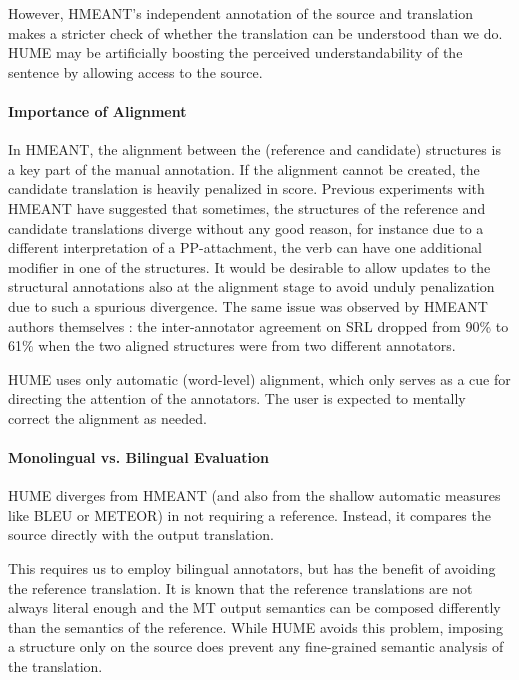 \documentclass[11pt]{article}
\def\parcite#1{\cite{#1}}
\begin{document}
However, HMEANT's independent annotation of the source and translation makes a stricter check
of whether the translation can be understood
than we do. HUME may be artificially boosting the perceived understandability of
the sentence by allowing access to the source.

\paragraph{Importance of Alignment}

In HMEANT, the alignment between the (reference and candidate) structures is a key
part of the manual annotation. If the alignment cannot be created, the candidate
translation is heavily penalized in score.
Previous experiments with HMEANT
\parcite{bojar:wu:ssst:2012,chuchunkov-tarelkin-galinskaya:2014:SSST-8} have
suggested that sometimes, the structures of the reference and candidate
translations diverge without any good reason, for instance due to a different
interpretation of a PP-attachment, the verb can have one additional modifier in
one of the structures. It would be desirable to allow updates to the structural
annotations also at the alignment stage
to avoid unduly penalization due to such a spurious divergence.
The same issue was observed by HMEANT authors themselves
\parcite{lo:wu:reliability:2014}:
the 
inter-annotator agreement on SRL dropped from 90\% to 61\% 
when the two aligned structures were from two different annotators.

HUME uses only automatic (word-level) alignment, which only serves as a cue for directing
the attention of the annotators.
The user is expected to mentally correct the alignment as needed.


\paragraph{Monolingual vs. Bilingual Evaluation}
HUME diverges from HMEANT (and also from the shallow automatic measures
like BLEU or METEOR) in not requiring a reference.
Instead, it compares the source directly with the output translation.

This requires us to employ bilingual annotators, but has the benefit of avoiding
the reference translation. It is known that the reference translations are not
always literal enough and the MT output semantics can be composed differently
than the semantics of the reference. While HUME avoids this problem,
imposing a structure only on the source does prevent any fine-grained semantic
analysis of the translation.
\end{document}
